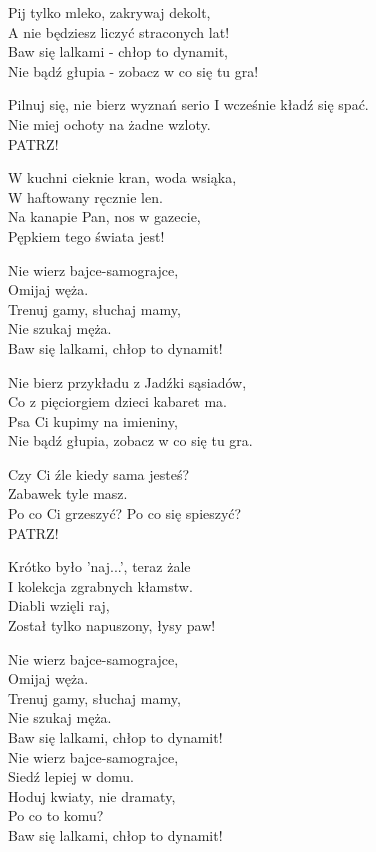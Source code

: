 \begin{text}
    Pij tylko mleko, zakrywaj dekolt,\\
    A nie będziesz liczyć straconych lat!\\
    Baw się lalkami - chłop to dynamit,\\
    Nie bądź głupia - zobacz w co się tu gra!

    Pilnuj się, nie bierz wyznań serio
    I wcześnie kładź się spać.\\
    Nie miej ochoty na żadne wzloty.\\
    PATRZ!

    W kuchni cieknie kran, woda wsiąka,\\
    W haftowany ręcznie len.\\
    Na kanapie Pan, nos w gazecie,\\
    Pępkiem tego świata jest!

    \vin Nie wierz bajce-samograjce,\\
    \vin Omijaj węża.\\
    \vin Trenuj gamy, słuchaj mamy,\\
    \vin Nie szukaj męża.\\
    \vin Baw się lalkami, chłop to dynamit!

    Nie bierz przykładu z Jadźki sąsiadów,\\
    Co z pięciorgiem dzieci kabaret ma.\\
    Psa Ci kupimy na imieniny,\\
    Nie bądź głupia, zobacz w co się tu gra.

    Czy Ci źle kiedy sama jesteś?\\
    Zabawek tyle masz.\\
    Po co Ci grzeszyć? Po co się spieszyć?\\
    PATRZ!

    Krótko było 'naj...', teraz żale\\
    I kolekcja zgrabnych kłamstw.\\
    Diabli wzięli raj,\\
    Został tylko napuszony, łysy paw!

    \vin Nie wierz bajce-samograjce,\\
    \vin Omijaj węża.\\
    \vin Trenuj gamy, słuchaj mamy,\\
    \vin Nie szukaj męża.\\
    \vin Baw się lalkami, chłop to dynamit!\\
    \vin Nie wierz bajce-samograjce,\\
    \vin Siedź lepiej w domu.\\
    \vin Hoduj kwiaty, nie dramaty,\\
    \vin Po co to komu?\\
    \vin Baw się lalkami, chłop to dynamit!
\end{text}
